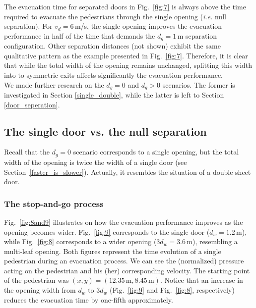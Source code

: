 The evacuation time for separated doors in Fig.~\ref{fig:7} is always above the 
time required to evacuate the pedestrians through the single opening 
(\emph{i.e.} null separation). For $v_d=6\,$m/s, the single opening improves 
the evacuation performance in half of the time that demands the $d_g=1\,$m 
separation configuration. Other separation distances (not shown) exhibit the 
same qualitative pattern as the example presented in Fig.~\ref{fig:7}. 
Therefore, it is clear that while the total width of the opening 
remains unchanged, splitting this width into to symmetric exits affects 
significantly the evacuation performance. \\

We made further research on the $d_g=0$ and $d_g>0$ scenarios. The 
former is investigated in Section \ref{single_double}, while the latter is left 
to Section \ref{door_seperation}. \\

\subsection{\label{single_double}The single door vs. the null separation}

Recall that the $d_g=0$ scenario corresponds to a single opening, but the total 
width of the opening is twice the width of a single door (see 
Section~\ref{faster_is_slower}). Actually, it resembles the situation of a 
double sheet door.  \\

\subsubsection{\label{null_gap_data}The stop-and-go process}

Fig.~\ref{fig:8and9} illustrates on how the evacuation performance improves as 
the opening becomes wider.  Fig.~\ref{fig:9} corresponds to the single door 
($d_w=1.2\,$m), while  Fig.~\ref{fig:8} corresponds to a wider opening 
($3d_w=3.6\,$m), resembling a multi-leaf opening. Both figures represent 
the time evolution of a single pedestrian during an evacuation process. We can 
see the (normalized) pressure acting on the pedestrian and his (her) 
corresponding velocity. The starting point of the pedestrian was 
$(x,y)=(12.35\,\mathrm{m},8.45\,\mathrm{m})$. Notice that an increase in the 
opening width from $d_w$ to $3d_w$ (Fig.~\ref{fig:9} and Fig.~\ref{fig:8}, 
respectively) reduces the evacuation time by one-fifth approximately. \\

